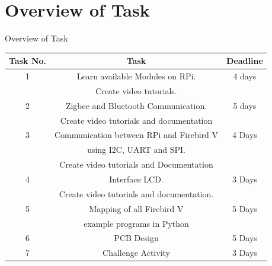 \documentclass[10pt, a4paper]{beamer}
\begin{document}
\section{Overview of Task}
\begin{frame}{Overview of Task}
		\begin{center}
			\begin{tabular}{|c|c|c|}
				\hline
				Task No. & Task & Deadline\\
				\hline
				1 & Learn available Modules on RPi. &  4 days \\ & Create video tutorials. &     \\ 
				\hline
				2 & Zigbee and Bluetooth Communication. & 5 days\\ & Create video tutorials and documentation &  \\
				\hline
				3 & Communication between RPi and Firebird V & 4 Days \\ & using I2C, UART and SPI. &\\ & Create video tutorials and Documentation  & \\
				\hline
				4 & Interface LCD.& 3 Days\\ & Create video tutorials and documentation. & \\
				\hline
				5 & Mapping of all Firebird V & 5 Days\\ & example programs in Python & \\
				\hline
				6 & PCB Design & 5 Days \\
				\hline
				7 & Challenge Activity & 3 Days\\
				\hline
			\end{tabular}
		\end{center}
\end{frame}
\end{document}
